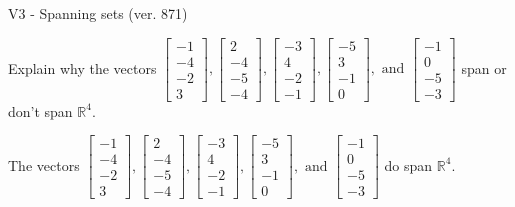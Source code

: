 \begin{exercise}
  \begin{exerciseTitle}V3 - Spanning sets (ver. 871)\end{exerciseTitle}
  \begin{exerciseStatement}
    Explain why the vectors \(\left[\begin{array}{r}
-1 \\
-4 \\
-2 \\
3
\end{array}\right] , \left[\begin{array}{r}
2 \\
-4 \\
-5 \\
-4
\end{array}\right] , \left[\begin{array}{r}
-3 \\
4 \\
-2 \\
-1
\end{array}\right] , \left[\begin{array}{r}
-5 \\
3 \\
-1 \\
0
\end{array}\right] , \text{ and } \left[\begin{array}{r}
-1 \\
0 \\
-5 \\
-3
\end{array}\right]\) span or don't span \(\mathbb{R}^4\). 
	


  \end{exerciseStatement}
  \begin{exerciseAnswer}
   The vectors \(\left[\begin{array}{r}
-1 \\
-4 \\
-2 \\
3
\end{array}\right] , \left[\begin{array}{r}
2 \\
-4 \\
-5 \\
-4
\end{array}\right] , \left[\begin{array}{r}
-3 \\
4 \\
-2 \\
-1
\end{array}\right] , \left[\begin{array}{r}
-5 \\
3 \\
-1 \\
0
\end{array}\right] , \text{ and } \left[\begin{array}{r}
-1 \\
0 \\
-5 \\
-3
\end{array}\right]\) 
  	 do  
	span \(\mathbb{R}^4\).
  



\end{exerciseAnswer}
\end{exercise}
